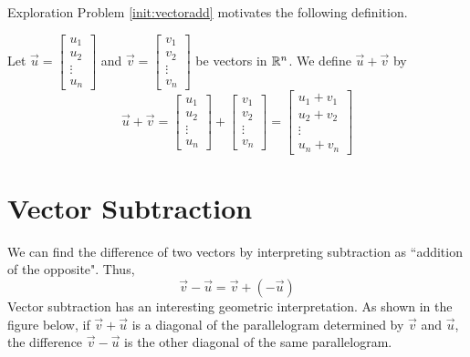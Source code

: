 \documentclass{ximera}
\begin{document}
Exploration Problem \ref{init:vectoradd} motivates the following definition.
  \begin{definition}\label{def:vectoradd} 
  Let $\vec{u}=\begin{bmatrix}
u_1\\
u_2\\
\vdots\\
u_n
\end{bmatrix}$ and $\vec{v}=\begin{bmatrix}
v_1\\
v_2\\
\vdots\\
v_n
\end{bmatrix}$ be vectors in $\mathbb{R}^n$.  We define $\vec{u}+\vec{v}$ by
  $$\vec{u}+\vec{v}=\begin{bmatrix}
u_1\\
u_2\\
\vdots\\
u_n
\end{bmatrix}+\begin{bmatrix}
v_1\\
v_2\\
\vdots\\
v_n
\end{bmatrix}=\begin{bmatrix}
u_1+v_1\\
u_2+v_2\\
\vdots\\
u_n+v_n
\end{bmatrix}$$
  
\end{definition}

\section*{Vector Subtraction}
We can find the difference of two vectors by interpreting subtraction as ``addition of the opposite".  Thus,
$$\vec{v}-\vec{u}=\vec{v}+(-\vec{u})$$
Vector subtraction has an interesting geometric interpretation.  As shown in the figure below, if $\vec{v}+\vec{u}$ is a diagonal of the parallelogram determined by $\vec{v}$ and $\vec{u}$, the difference $\vec{v}-\vec{u}$ is the other diagonal of the same parallelogram.
\end{document}
